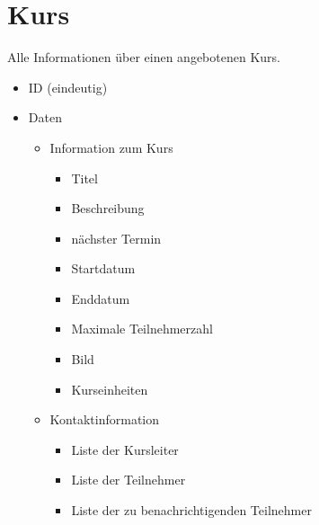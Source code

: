 \documentclass[a4paper]{scrreprt}
\newcounter{Lc}
\newcounter{Hc}
\newcommand{\stepHc}{\stepcounter{Hc}\setcounter{Lc}{0}}
\begin{document}
\section{Kurs}
\Func {} Alle Informationen über einen angebotenen Kurs. 
\begin{itemize}
	\item ID  (eindeutig)
	\item Daten
	\begin{itemize}
		\item Information zum Kurs
		\begin{itemize}
			\item Titel 
			\item Beschreibung 
			\item nächster Termin 
			\item Startdatum 
			\item Enddatum 
			\item Maximale Teilnehmerzahl
			\item Bild
			\item Kurseinheiten 		
		\end{itemize}
		\item Kontaktinformation
		\begin{itemize}
			\item Liste der Kursleiter
			\item Liste der Teilnehmer 
			\item Liste der zu benachrichtigenden Teilnehmer
		\end{itemize}	
	\end{itemize}
	
	
	
\end{itemize}
\stepHc		    
\end{document}
